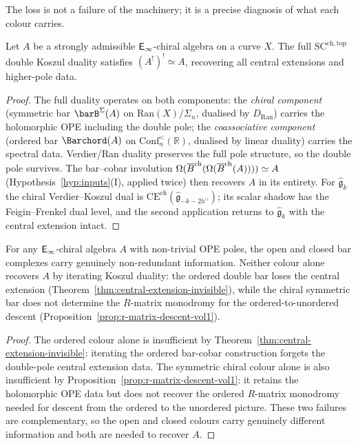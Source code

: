 The loss is not a failure of the machinery; it is a precise
diagnosis of what each colour carries.

\begin{theorem}
\ClaimStatusProvedHere
\label{thm:two-colour-double-kd}
Let $A$ be a strongly admissible $\mathsf{E}_{\infty}$-chiral algebra on a curve
$X$. The full $\mathrm{SC}^{\mathrm{ch,top}}$ double Koszul duality
satisfies $(A^!)^! \simeq A$, recovering all central extensions and
higher-pole data.
\end{theorem}

\begin{proof}
The full duality operates on both components: the \emph{chiral component}
(symmetric bar $\barB^{\Sigma}(A)$ on $\mathrm{Ran}(X)/\Sigma_n$,
dualised by $D_{\mathrm{Ran}}$) carries the holomorphic OPE including
the double pole; the \emph{coassociative component} (ordered bar
$\Barchord(A)$ on $\mathrm{Conf}_n^{<}(\mathbb{R})$,
dualised by linear duality) carries the spectral data. Verdier/Ran
duality preserves the full pole structure, so the double pole
survives. The bar--cobar involution
$\Omega(\overline{B}^{\mathrm{ch}}(\Omega(\overline{B}^{\mathrm{ch}}(A)))) \simeq A$
(Hypothesis~\ref{hyp:inputs}(I), applied twice) then recovers $A$ in
its entirety. For $\widehat{\mathfrak{g}}_k$ the chiral
Verdier--Koszul dual is
$\mathrm{CE}^{\mathrm{ch}}(\widehat{\mathfrak{g}}_{-k-2h^\vee})$;
its scalar shadow has the Feigin--Frenkel dual level, and the second
application returns to $\widehat{\mathfrak{g}}_k$ with the central
extension intact.
\end{proof}

\begin{corollary}
\ClaimStatusProvedHere
\label{cor:two-colours-non-redundant}
For any $\mathsf{E}_{\infty}$-chiral algebra $A$ with non-trivial OPE poles, the
open and closed bar complexes carry genuinely non-redundant
information. Neither colour alone recovers $A$ by iterating Koszul
duality: the ordered double bar loses the central extension
\textup{(Theorem~\ref{thm:central-extension-invisible})}, while the
chiral symmetric bar does not determine the $R$-matrix
monodromy for the ordered-to-unordered descent
\textup{(Proposition~\ref{prop:r-matrix-descent-vol1})}.
\end{corollary}

\begin{proof}
The ordered colour alone is insufficient by
Theorem~\ref{thm:central-extension-invisible}: iterating the ordered
bar-cobar construction forgets the double-pole central extension data.
The symmetric chiral colour alone is also insufficient by
Proposition~\ref{prop:r-matrix-descent-vol1}: it retains the holomorphic
OPE data but does not recover the ordered $R$-matrix monodromy needed
for descent from the ordered to the unordered picture.
These two failures are complementary, so the open and closed colours
carry genuinely different information and both are needed to recover
$A$.
\end{proof}

